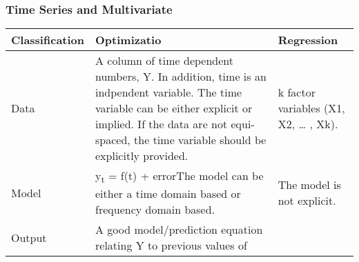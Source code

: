 \documentclass[]{book}
\theoremstyle{definition}
\theoremstyle{definition}
\theoremstyle{definition}
\theoremstyle{remark}
\begin{document}
\subsubsection{Time Series and
Multivariate}\label{time-series-and-multivariate}

\begin{longtable}[]{@{}lll@{}}
\toprule
\begin{minipage}[b]{0.14\columnwidth}\raggedright\strut
Classification\strut
\end{minipage} & \begin{minipage}[b]{0.39\columnwidth}\raggedright\strut
Optimizatio\strut
\end{minipage} & \begin{minipage}[b]{0.39\columnwidth}\raggedright\strut
Regression\strut
\end{minipage}\tabularnewline
\midrule
\endhead
\begin{minipage}[t]{0.14\columnwidth}\raggedright\strut
Data\strut
\end{minipage} & \begin{minipage}[t]{0.39\columnwidth}\raggedright\strut
A column of time dependent numbers, Y. In addition, time is an
indpendent variable. The time variable can be either explicit or
implied. If the data are not equi-spaced, the time variable should be
explicitly provided.\strut
\end{minipage} & \begin{minipage}[t]{0.39\columnwidth}\raggedright\strut
k factor variables (X1, X2, \ldots{} , Xk).\strut
\end{minipage}\tabularnewline
\begin{minipage}[t]{0.14\columnwidth}\raggedright\strut
Model\strut
\end{minipage} & \begin{minipage}[t]{0.39\columnwidth}\raggedright\strut
y\textsubscript{t} = f(t) + errorThe model can be either a time domain
based or frequency domain based.\strut
\end{minipage} & \begin{minipage}[t]{0.39\columnwidth}\raggedright\strut
The model is not explicit.\strut
\end{minipage}\tabularnewline
\begin{minipage}[t]{0.14\columnwidth}\raggedright\strut
Output\strut
\end{minipage} & \begin{minipage}[t]{0.39\columnwidth}\raggedright\strut
A good model/prediction equation relating Y to previous values of

\end{minipage}
\end{longtable}
\end{document}
